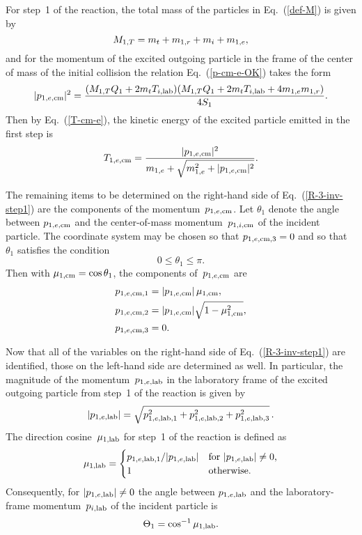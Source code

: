 {For step~1 of the reaction, the total mass of the particles
in Eq.~(\ref{def-M}) is given by
\begin{equation}
  M_{1,T} = m_t + m_{1,r} + m_i + m_{1,e},
 \label{def-M-step1}
\end{equation}
and for the momentum of the excited outgoing particle in
the frame of the center of mass of the initial collision the
relation Eq.~(\ref{p-cm-e-OK}) takes the form
\begin{equation}
  |p_{1,e,\textrm{cm}}|^2 = \frac{ (M_{1,T} Q_1 +  2m_t T_{i,\textrm{lab}} )
                 ( M_{1,T} Q_1 +  2m_t T_{i,\textrm{lab}} + 4m_{1,e} m_{1,r})}
                {4 S_1 }.
  \label{p-cm-e-OK-step1}
\end{equation}
Then by Eq.~(\ref{T-cm-e}), the kinetic energy of the excited
particle emitted in the first step is
\begin{equation}
  T_{1,e,\textrm{cm}} = \frac{|p_{1,e,\textrm{cm}}|^2 }
          {m_{1,e} + \sqrt{ m_{1,e}^2 + |p_{1,e,\textrm{cm}}|^2 }}.
 \label{T-cm-e-step1}
\end{equation}

The remaining items to be determined on the right-hand
side of Eq.~(\ref{R-3-inv-step1}) are the components of
the momentum~$p_{1,e,\textrm{cm}}$.
Let $\theta_1$ denote the angle between $p_{1,e,\textrm{cm}}$ and the
center-of-mass momentum~$p_{1,i,\textrm{cm}}$ of the incident particle.
The coordinate system may be
chosen so that $p_{1,e,\textrm{cm},3} = 0$ and so that~$\theta_1$
satisfies the condition
$$
  0 \le \theta_1 \le \pi.
$$
Then with $\mu_{\text{1,cm}} = \cos \theta_1$, the components 
of~$p_{1,e,\textrm{cm}}$ are
\begin{equation*}
\begin{split}
  p_{1,e,\textrm{cm},1} &= | p_{1,e,\textrm{cm}} | \, \mu_{\text{1,cm}}, \\
  p_{1,e,\textrm{cm},2} &=     |   p_{1,e,\textrm{cm}} | \sqrt{ 1 - \mu_{\text{1,cm}}^2 }, \\
  p_{1,e,\textrm{cm},3} &=     0.
\end{split}
\end{equation*}

Now that all of the variables on the  right-hand
side of Eq.~(\ref{R-3-inv-step1}) are identified, those on
the left-hand side are determined as well.  In particular,
the magnitude of the momentum~$p_{1,e,\textrm{lab}}$ in the laboratory
frame of the excited
outgoing particle from step~1 of the reaction is given by
\begin{equation}
  | p_{1,e,\textrm{lab}} | = \sqrt{ p_{1,e,\textrm{lab},1}^2 + p_{1,e,\textrm{lab},2}^2 + p_{1,e,\textrm{lab},3}^2 }\,.
 \label{plab-rel-step1}
\end{equation}
The direction cosine~$\mu_{\text{1,lab}}$ for step~1 of the reaction is
defined as
\begin{equation}
  \mu_{\text{1,lab}} = 
  \begin{cases}
     p_{1,e,\textrm{lab},1} / | p_{1,e,\textrm{lab}} | &
       \text{for $| p_{1,e,\textrm{lab}} | \ne 0$,} \\
     1 & \text{otherwise.}
   \end{cases}
 \label{mu-lab-step1}
\end{equation}
Consequently, for $| p_{1,e,\textrm{lab}} | \ne 0$ the angle between
$p_{1,e,\textrm{lab}}$ and the laboratory-frame momentum~$p_{i,\textrm{lab}}$
of the incident particle is
\begin{equation}
   \Theta_1 = \cos^{-1} \mu_{\text{1,lab}}.
 \label{def-Theta1}
\end{equation}

}
